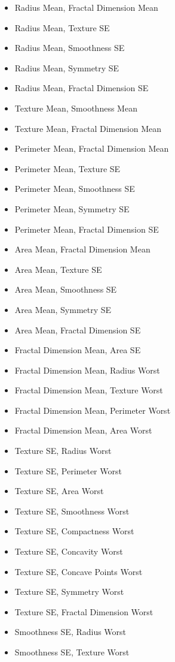 \documentclass[11pt,a4paper]{article}
\numberwithin{equation}{section}
\begin{document}
\begin{multicols}{2}
\begin{itemize}
\item Radius Mean, Fractal Dimension Mean
\item Radius Mean, Texture SE
\item Radius Mean, Smoothness SE
\item Radius Mean, Symmetry SE
\item Radius Mean, Fractal Dimension SE
\item Texture Mean, Smoothness Mean
\item Texture Mean, Fractal Dimension Mean
\item Perimeter Mean, Fractal Dimension Mean
\item Perimeter Mean, Texture SE
\item Perimeter Mean, Smoothness SE
\item Perimeter Mean, Symmetry SE
\item Perimeter Mean, Fractal Dimension SE
\item Area Mean, Fractal Dimension Mean
\item Area Mean, Texture SE
\item Area Mean, Smoothness SE
\item Area Mean, Symmetry SE
\item Area Mean, Fractal Dimension SE
\item Fractal Dimension Mean, Area SE
\item Fractal Dimension Mean, Radius Worst
\item Fractal Dimension Mean, Texture Worst
\item Fractal Dimension Mean, Perimeter Worst
\item Fractal Dimension Mean, Area Worst
\item Texture SE, Radius Worst
\item Texture SE, Perimeter Worst
\item Texture SE, Area Worst
\item Texture SE, Smoothness Worst
\item Texture SE, Compactness Worst
\item Texture SE, Concavity Worst
\item Texture SE, Concave Points Worst
\item Texture SE, Symmetry Worst
\item Texture SE, Fractal Dimension Worst
\item Smoothness SE, Radius Worst
\item Smoothness SE, Texture Worst

\end{itemize}
\end{multicols}
\end{document}
